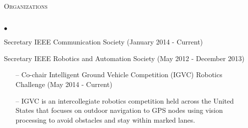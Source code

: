 \documentclass[11pt]{article}
\newcommand{\lineunder}{\vspace*{-8pt} \\ \hspace*{-18pt} \hrulefill \\}
\newcommand{\header}[1]{{\hspace*{-10pt}\vspace*{6pt} \textsc{#1}} \vspace*{-6pt} \lineunder}
\newenvironment{achievements}{\begin{list}{$\bullet$}{\topsep 0pt \itemsep -2pt}}{\vspace*{4pt}\end{list}}
\begin{document}
\header{Organizations}
\begin{achievements}
\item  Secretary IEEE Communication Society (January 2014 - Current)
\item Secretary IEEE Robotics and Automation Society (May 2012 - December 2013)
	\begin{enumerate}
		\item[--] Co-chair Intelligent Ground Vehicle Competition (IGVC) Robotics Challenge (May 2014 - Current)
        \item[--] IGVC is an intercollegiate robotics competition held across the United States that focuses on outdoor navigation to GPS nodes using vision processing to avoid obstacles and stay within marked lanes.
    \end{enumerate}
\end{achievements}
\end{document}
